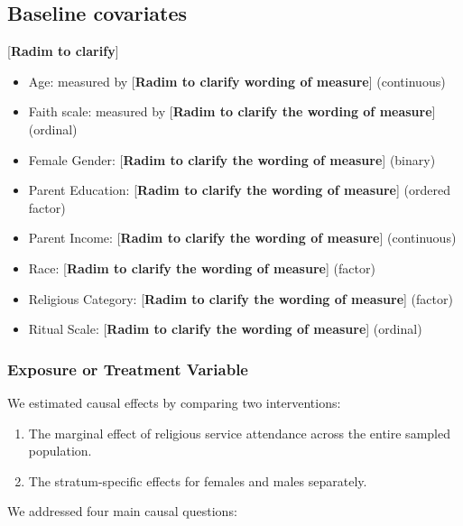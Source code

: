 \documentclass[
  single column]{article}
\providecommand{\tightlist}{%
  \setlength{\itemsep}{0pt}\setlength{\parskip}{0pt}}\usepackage{longtable,booktabs,array}
\begin{document}
\subsection{Baseline covariates}\label{baseline-covariates}

{[}\textbf{Radim to clarify}{]}

\begin{itemize}
\tightlist
\item
  Age: measured by {[}\textbf{Radim to clarify wording of measure}{]}
  (continuous)
\item
  Faith scale: measured by {[}\textbf{Radim to clarify the wording of
  measure}{]} (ordinal)
\item
  Female Gender: {[}\textbf{Radim to clarify the wording of measure}{]}
  (binary)
\item
  Parent Education: {[}\textbf{Radim to clarify the wording of
  measure}{]} (ordered factor)
\item
  Parent Income: {[}\textbf{Radim to clarify the wording of measure}{]}
  (continuous)
\item
  Race: {[}\textbf{Radim to clarify the wording of measure}{]} (factor)
\item
  Religious Category: {[}\textbf{Radim to clarify the wording of
  measure}{]} (factor)
\item
  Ritual Scale: {[}\textbf{Radim to clarify the wording of measure}{]}
  (ordinal)
\end{itemize}

\subsubsection{Exposure or Treatment
Variable}\label{exposure-or-treatment-variable}

We estimated causal effects by comparing two interventions:

\begin{enumerate}
\def\labelenumi{\arabic{enumi}.}
\tightlist
\item
  The marginal effect of religious service attendance across the entire
  sampled population.
\item
  The stratum-specific effects for females and males separately.
\end{enumerate}

We addressed four main causal questions:
\end{document}
